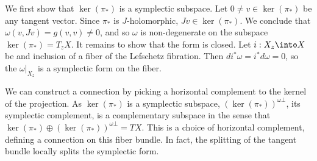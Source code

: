 

    We first show that $\ker(\pi_*)$ is a symplectic subspace. 
    Let $0\neq v\in \ker(\pi_*)$ be any tangent vector.
    Since $\pi_*$ is $J$-holomorphic, $Jv\in \ker(\pi_*)$. 
    We conclude that $\omega(v, Jv)=g(v, v)\neq 0$, and so $\omega$ is non-degenerate on the subspace $\ker(\pi_*)=T_zX$. 
    It remains to show that the form is closed. 
    Let $i:X_z\into X$ be and inclusion of a fiber of the Lefschetz fibration.
    Then $di^*\omega= i^*d\omega =0$, so the $\omega|_{X_z}$ is a symplectic form on the fiber. 

    We can construct a connection by picking a horizontal complement to the kernel of the projection. 
    As $\ker(\pi_*)$ is a symplectic subspace, $(\ker(\pi_*))^{\omega\bot}$, its symplectic complement, is a complementary subspace in the sense that $\ker(\pi_*)\oplus (\ker(\pi_*))^{\omega\bot}=TX$. 
    This is a choice of horizontal complement, defining a connection on this fiber bundle. 
    In fact, the splitting of the tangent bundle locally splits the symplectic form. 



